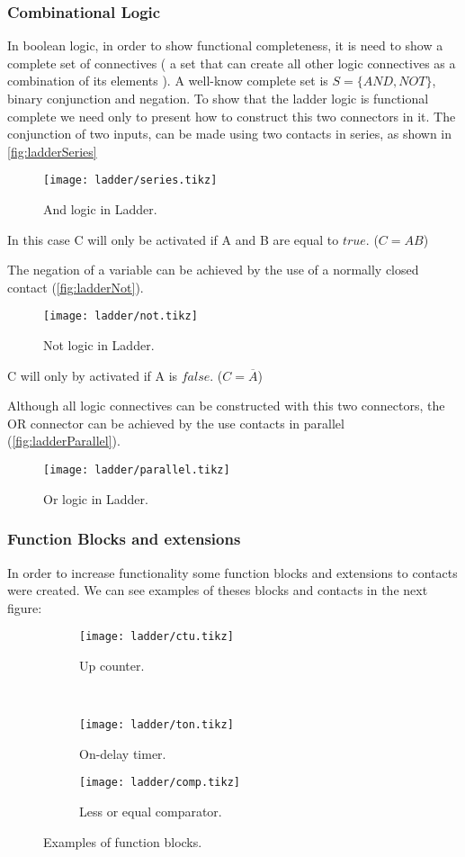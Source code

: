\subsubsection{Combinational Logic}
In boolean logic, in order to show functional completeness, it is need to show a
complete set of connectives ( a set that can create all other logic connectives
as a combination of its elements ). A well-know complete set is $S=\{AND,NOT\}$,
binary conjunction and negation.
To show that the ladder logic is functional complete we need only to present how
to construct this two connectors in it.
The conjunction of two inputs, can be made using two contacts in series, as
shown in \autoref{fig:ladderSeries}
\begin{figure}[H]
  \centering \texttt{[image: ladder/series.tikz]}
  \caption{And logic in Ladder.}
  \label{fig:ladderSeries}
\end{figure}
In this case C will only be activated if A and B are equal to $true$. ($C=AB$)

The negation of a variable can be achieved by the use of a normally closed
contact (\autoref{fig:ladderNot}).
\begin{figure}[H]
  \centering \texttt{[image: ladder/not.tikz]}
  \caption{Not logic in Ladder.}
  \label{fig:ladderNot}
\end{figure}
C will only by activated if A is $false$. ($C=\overline{A}$)

Although all logic connectives can be constructed with this two connectors, the
OR connector can be achieved by the use contacts in parallel (\autoref{fig:ladderParallel}).
\begin{figure}[H]
  \centering \texttt{[image: ladder/parallel.tikz]}
  \caption{Or logic in Ladder.}
  \label{fig:ladderParallel}
\end{figure}

\subsubsection{Function Blocks and extensions}
In order to increase functionality some function blocks and 
extensions to contacts were created. We can see examples of theses blocks and
contacts in the next figure:

\begin{figure}[H]
   \centering
\begin{subfigure}[t]{0.45\textwidth}
  \centering \texttt{[image: ladder/ctu.tikz]}
  \caption{Up counter.}
  \label{fig:ctu}
\end{subfigure}
~
\begin{subfigure}[t]{0.45\textwidth}
  \centering \texttt{[image: ladder/ton.tikz]}
  \caption{On-delay timer.}
  \label{fig:ton}
\end{subfigure}

\begin{subfigure}[t]{0.45\textwidth}
  \centering \texttt{[image: ladder/comp.tikz]}
  \caption{Less or equal comparator.}
  \label{fig:comp}
\end{subfigure}
  \caption{Examples of function blocks.}
  \label{fig:functionBlocks}
\end{figure}


